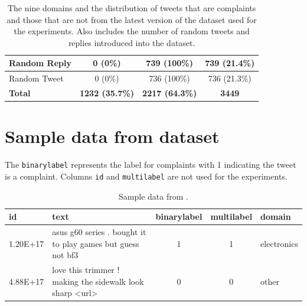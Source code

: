 \begin{table}[ht]
\begin{tabularx}{\textwidth}{|X|c|c|c|}
        Random Reply                & 0 \small{(0\%)}       & 739 \small{(100\%)}     & 739 \small{(21.4\%)}  \\
        \hline
        Random Tweet                & 0 \small{(0\%)}       & 736 \small{(100\%)}     & 736 \small{(21.3\%)}  \\
        \hline
        \hline
        \rowcolor[gray]{0.9}
        \textbf{Total}              & \textbf{1232 \small{(35.7\%)}}   & \textbf{2217 \small{(64.3\%)}}      & \textbf{3449}                  \\
        \hline
    \end{tabularx}
    \caption{The nine domains and the distribution of tweets that are complaints and those that are not from the latest version of the dataset used for the experiments. Also includes the number of random tweets and replies introduced into the dataset.}
    \label{tab: fulldataset_breakdown}
\end{table}

\section{Sample data from dataset}
The \texttt{binarylabel} represents the label for complaints with 1 indicating the tweet is a complaint. Columns \texttt{id} and \texttt{multilabel} are not used for the experiments.
\begin{table}[ht]
    \captionsetup{font=small}
    \centering
    \begin{tabularx}{\textwidth}{|l|X|c|c|l|}
        \hline
        \rowcolor[gray]{0.7}
        \textbf{id} & \textbf{text}                                               & \textbf{binarylabel} & \textbf{multilabel} & \textbf{domain} \\
        \hline
        1.20E+17    & asus g60 series . bought it to play games but guess not bf3 & 1                    & 1                   & electronics     \\
        \hline
        4.88E+17    & love this trimmer ! making the sidewalk look sharp <url>    & 0                    & 0                   & other           \\
        \hline
    \end{tabularx}
    \caption{Sample data from \cite{jinModelingSeverityComplaints2021}.} 
    \label{tab: apdx_sample_data}
\end{table}


